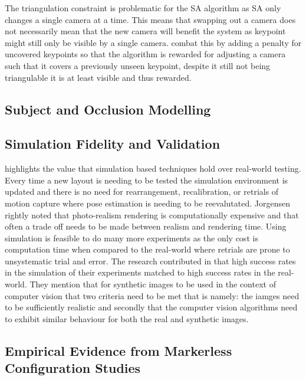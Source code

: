 The triangulation constraint is problematic for the SA algorithm as SA only changes a single camera at a time. This means that swapping out a camera does not necessarily mean that the new camera will benefit the system as keypoint might still only be visible by a single camera. \citet{rahimian2016optimal} combat this by adding a penalty for uncovered keypoints so that the algorithm is rewarded for adjusting a camera such that it covers a previously unseen keypoint, despite it still not being triangulable it is at least visible and thus rewarded. 

\subsection{Subject and Occlusion Modelling}

\subsection{Simulation Fidelity and Validation}
\citet{jorgensen2018simulation} highlights the value that simulation based techniques hold over real-world testing. Every time a new layout is needing to be tested the simulation environment is updated and there is no need for rearrangement, recalibration, or retrials of motion capture where pose estimation is needing to be reevalutated. Jorgensen rightly noted that photo-realism rendering is computationally expensive and that often a trade off needs to be made between realism and rendering time. Using simulation is feasible to do many more experiments as the only cost is computation time when compared to the real-world where retrials are prone to unsystematic trial and error. The research contributed in that high success rates in the simulation of their experiments matched to high success rates in the real-world. They mention that for synthetic images to be used in the context of computer vision that two criteria need to be met that is namely: the iamges need to be sufficiently realistic and secondly that the computer vision algorithms need to exhibit similar behaviour for both the real and synthetic images. 

\subsection{Empirical Evidence from Markerless Configuration Studies}
\cite{kwak2025assessing}
\cite{yang2025comparison}
\cite{nishikawa2025comparison}
\cite{kim2026comparison}
\cite{wren2023comparison}

